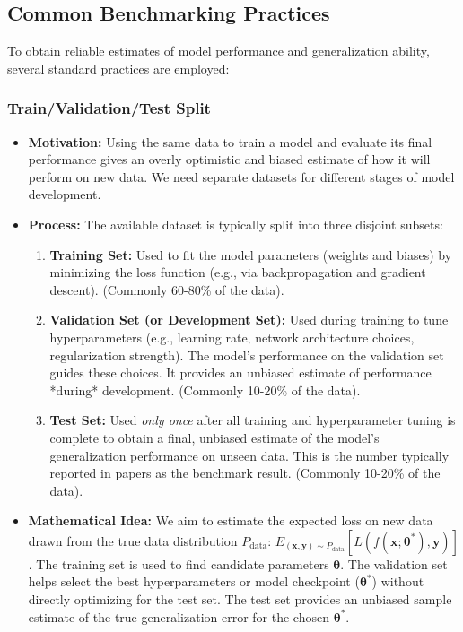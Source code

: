 \documentclass{article}
\newcommand{\btheta}{\bm{\theta}}
\newcommand{\bx}{\bm{x}}
\newcommand{\by}{\bm{y}}
\begin{document}
\subsection{Common Benchmarking Practices}

To obtain reliable estimates of model performance and generalization ability, several standard practices are employed:

\subsubsection{Train/Validation/Test Split}
\begin{itemize}
    \item \textbf{Motivation:} Using the same data to train a model and evaluate its final performance gives an overly optimistic and biased estimate of how it will perform on new data. We need separate datasets for different stages of model development.
    \item \textbf{Process:} The available dataset is typically split into three disjoint subsets:
        \begin{enumerate}
            \item \textbf{Training Set:} Used to fit the model parameters (weights and biases) by minimizing the loss function (e.g., via backpropagation and gradient descent). (Commonly 60-80\% of the data).
            \item \textbf{Validation Set (or Development Set):} Used during training to tune hyperparameters (e.g., learning rate, network architecture choices, regularization strength). The model's performance on the validation set guides these choices. It provides an unbiased estimate of performance *during* development. (Commonly 10-20\% of the data).
            \item \textbf{Test Set:} Used \emph{only once} after all training and hyperparameter tuning is complete to obtain a final, unbiased estimate of the model's generalization performance on unseen data. This is the number typically reported in papers as the benchmark result. (Commonly 10-20\% of the data).
        \end{enumerate}
    \item \textbf{Mathematical Idea:} We aim to estimate the expected loss on new data drawn from the true data distribution $P_{\text{data}}$: $E_{(\bx,\by) \sim P_{\text{data}}}[L(f(\bx;\btheta^*), \by)]$. The training set is used to find candidate parameters $\btheta$. The validation set helps select the best hyperparameters or model checkpoint ($\btheta^*$) without directly optimizing for the test set. The test set provides an unbiased sample estimate of the true generalization error for the chosen $\btheta^*$.
\end{itemize}
\end{document}
